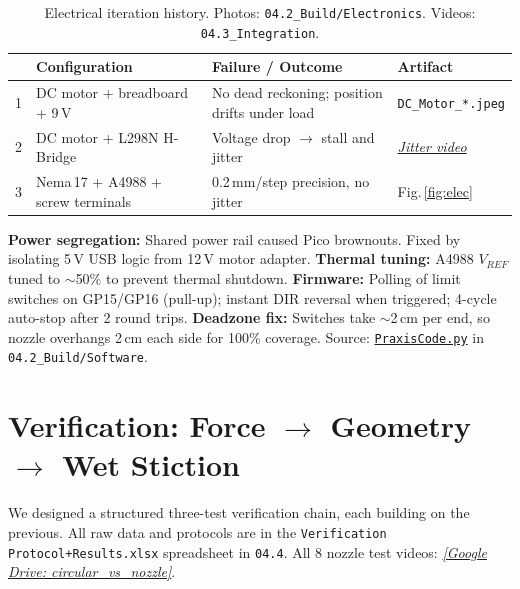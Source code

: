 \documentclass[12pt, letterpaper]{article}
\begin{document}
\vspace{-4pt}
\begin{table}[H]
\centering\small
\caption{Electrical iteration history. Photos: \texttt{04.2\_Build/Electronics}. Videos: \texttt{04.3\_Integration}.}
\begin{tabularx}{\textwidth}{@{}c l X l@{}}
\toprule
& \textbf{Configuration} & \textbf{Failure / Outcome} & \textbf{Artifact} \\
\midrule
1 & DC motor + breadboard + 9\,V & No dead reckoning; position drifts under load & \texttt{DC\_Motor\_*.jpeg} \\
2 & DC motor + L298N H-Bridge & Voltage drop $\rightarrow$ stall and jitter & \href{https://drive.google.com/drive/folders/1wNK_jYUvHXoMne_cIdYbAIURdvYpuG-J}{\textit{Jitter video}} \\
3 & Nema\,17 + A4988 + screw terminals & 0.2\,mm/step precision, no jitter & Fig.\,\ref{fig:elec} \\
\bottomrule
\end{tabularx}
\end{table}

\vspace{-4pt}
\textbf{Power segregation:} Shared power rail caused Pico brownouts. Fixed by isolating 5\,V USB logic from 12\,V motor adapter. \textbf{Thermal tuning:} A4988 $V_{REF}$ tuned to ${\sim}$50\% to prevent thermal shutdown. \textbf{Firmware:} Polling of limit switches on GP15/GP16 (pull-up); instant DIR reversal when triggered; 4-cycle auto-stop after 2 round trips. \textbf{Deadzone fix:} Switches take ${\sim}$2\,cm per end, so nozzle overhangs 2\,cm each side for 100\% coverage. Source: \href{https://github.com/memo-ozdincer/ESC203-AI-Prototypes/blob/master/dossier_artifacts/PraxisCode.py}{\texttt{PraxisCode.py}} in \texttt{04.2\_Build/Software}.

\section{Verification: Force $\rightarrow$ Geometry $\rightarrow$ Wet Stiction}

We designed a structured three-test verification chain, each building on the previous. All raw data and protocols are in the \texttt{Verification Protocol+Results.xlsx} spreadsheet in \texttt{04.4}. All 8 nozzle test videos: \href{https://drive.google.com/drive/folders/1RAJA95EF-XjMrkhjWkuoIBbONH_DbRVu}{\textit{[Google Drive: circular\_vs\_nozzle]}}.
\end{document}
